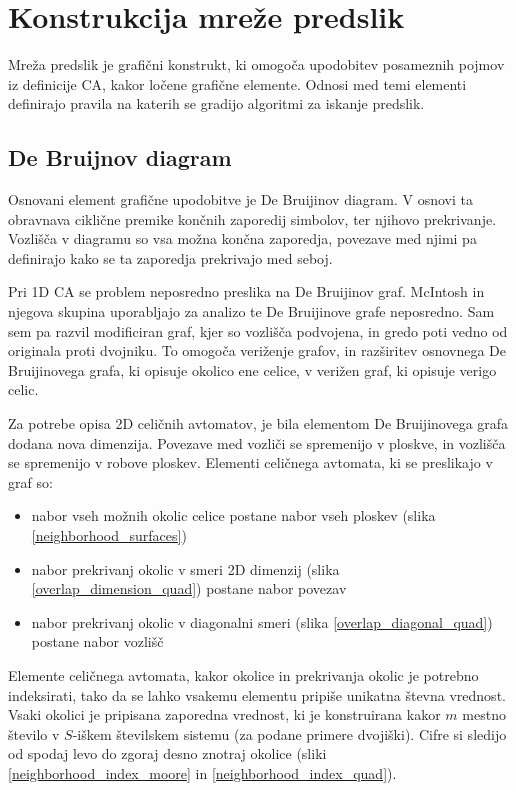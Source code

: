 \documentclass[12pt,a4paper,openany,twoside]{book}
\begin{document}
\chapter{Konstrukcija mreže predslik}

Mreža predslik je grafični konstrukt, ki omogoča upodobitev posameznih pojmov
iz definicije CA, kakor ločene grafične elemente. Odnosi med
temi elementi definirajo pravila na katerih se gradijo algoritmi za iskanje
predslik.

\section{De Bruijnov diagram}

Osnovani element grafične upodobitve je De Bruijinov diagram. V osnovi ta obravnava
ciklične premike končnih zaporedij simbolov, ter njihovo prekrivanje. Vozlišča v
diagramu so vsa možna končna zaporedja, povezave med njimi pa definirajo kako se
ta zaporedja prekrivajo med seboj.

Pri 1D CA se problem neposredno preslika na De Bruijinov graf. McIntosh
in njegova skupina uporabljajo za analizo te De Bruijinove grafe neposredno. Sam sem pa
razvil modificiran graf, kjer so vozlišča podvojena, in gredo poti vedno od originala
proti dvojniku. To omogoča veriženje grafov, in razširitev osnovnega De Bruijinovega
grafa, ki opisuje okolico ene celice, v verižen graf, ki opisuje verigo celic.

Za potrebe opisa 2D celičnih avtomatov, je bila elementom
De Bruijinovega grafa dodana nova dimenzija. Povezave med vozliči se spremenijo
v ploskve, in vozlišča se spremenijo v robove ploskev.
Elementi celičnega avtomata, ki se preslikajo v graf so:
\begin{itemize}[noitemsep,nolistsep]
\item nabor vseh možnih okolic celice postane nabor vseh ploskev (slika \ref{neighborhood_surfaces})
\item nabor prekrivanj okolic v smeri 2D dimenzij (slika \ref{overlap_dimension_quad}) postane nabor povezav
\item nabor prekrivanj okolic v diagonalni smeri (slika \ref{overlap_diagonal_quad}) postane nabor vozlišč
\end{itemize}

Elemente celičnega avtomata, kakor okolice in prekrivanja okolic je potrebno indeksirati,
tako da se lahko vsakemu elementu pripiše unikatna števna vrednost.
Vsaki okolici je pripisana zaporedna vrednost, ki je konstruirana kakor \(m\) mestno število
v \(S\)-iškem številskem sistemu (za podane primere dvojiški).
Cifre si sledijo od spodaj levo do zgoraj desno znotraj okolice
(sliki \ref{neighborhood_index_moore} in \ref{neighborhood_index_quad}).
\end{document}
